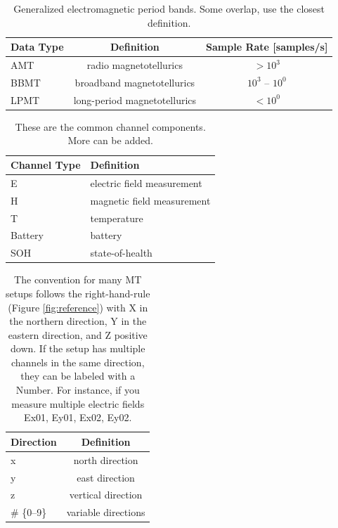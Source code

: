 \documentclass[12pt]{article}
\begin{document}
\begin{table}[h!]
	\centering
	\caption[Electromagnetic Period Bands]{Generalized electromagnetic period bands.  Some overlap, use the closest definition.}
	\begin{tabular}{lcc}
		\toprule
		\textbf{Data Type} & \textbf{Definition}  & \textbf{Sample Rate [samples/s]} \\ \midrule
		AMT & radio magnetotellurics & $>10^{3}$ \\ \midrule	
		BBMT & broadband magnetotellurics &  $10^{3}$ -- $10^{0}$ \\ \midrule
		LPMT & long-period magnetotellurics  &  $<10^{0}$\\ \midrule	
	\end{tabular}
	\label{tab:em}
\end{table}

\begin{table}[h!]
	\centering
	\caption[Channel Components]{These are the common channel components.  More can be added.}
	\begin{tabular}{ll}
		\toprule
		\textbf{Channel Type} & \textbf{Definition} \\ \midrule
		E & electric field measurement  \\ \midrule	
		H & magnetic field measurement \\ \midrule
		T & temperature \\ \midrule
		Battery & battery   \\ \midrule
		SOH & state-of-health   \\ \bottomrule		
	\end{tabular}
	\label{tab:channel_types}
\end{table}

\begin{table}[h!]
	\centering
	\caption[Channel Direction]{The convention for many MT setups follows the right-hand-rule (Figure \ref{fig:reference}) with X in the northern direction, Y in the eastern direction, and Z positive down.  If the setup has multiple channels in the same direction, they can be labeled with a Number.  For instance, if you measure multiple electric fields Ex01, Ey01, Ex02, Ey02.}
	\begin{tabular}{lc}
		\toprule
		\textbf{Direction} & \textbf{Definition} \\ \midrule
		x & north direction  \\ \midrule	
		y & east direction \\ \midrule
		z & vertical direction \\ \midrule
		\# \{0--9\} & variable directions   \\ \bottomrule		
	\end{tabular}
	\label{tab:diretions}
\end{table}
\end{document}
